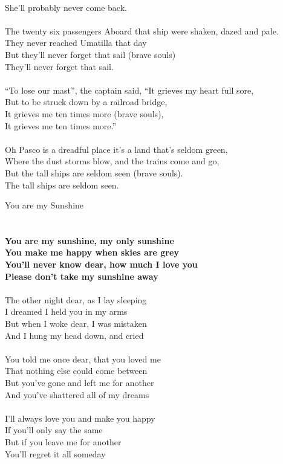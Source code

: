 \documentclass[letterpaper,9pt]{article}
\begin{document}
\\She'll probably never come back.
\\
\\The twenty six passengers Aboard that ship were shaken, dazed and pale.
\\They never reached Umatilla that day
\\But they'll never forget that sail (brave souls)
\\They'll never forget that sail.
\\
\\“To lose our mast”, the captain said, “It grieves my heart full sore,
\\But to be struck down by a railroad bridge,
\\It grieves me ten times more (brave souls),
\\It grieves me ten times more.”
\\
\\Oh Pasco is a dreadful place it's a land that's seldom green,
\\Where the dust storms blow, and the trains come and go,
\\But the tall ships are seldom seen (brave souls).
\\The tall ships are seldom seen.

\newpage
{}
\huge
You are my Sunshine\\
\\
\huge
\noindent
\\\textbf{You are my sunshine, my only sunshine
\\You make me happy when skies are grey
\\You'll never know dear, how much I love you
\\Please don't take my sunshine away}
\\
\\The other night dear, as  I lay sleeping
\\I dreamed I held you in my arms
\\But when I woke dear, I was mistaken
\\And I hung my head down, and cried
\\
\\You told me once dear, that you loved me
\\That nothing else could come between
\\But you've gone and left me for another
\\And you've shattered all of my dreams
\\
\\I'll always love you and make you happy 
\\If you'll only say the same
\\But if you leave me for another
\\You'll regret it all someday
\end{document}
